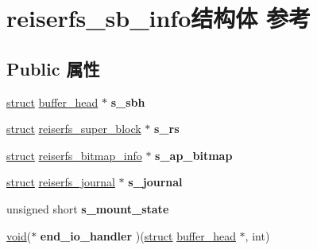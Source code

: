 \hypertarget{structreiserfs__sb__info}{}\section{reiserfs\+\_\+sb\+\_\+info结构体 参考}
\label{structreiserfs__sb__info}
\subsection*{Public 属性}
\begin{DoxyCompactItemize}
\item 
\mbox{\label{structreiserfs__sb__info_adb9d2be731b19dfcb1be8f90e3a9521b}} 
\hyperlink{interfacestruct}{struct} \hyperlink{structbuffer__head}{buffer\+\_\+head} $\ast$ {\bfseries s\+\_\+sbh}
\item 
\mbox{\label{structreiserfs__sb__info_a06ce31d699e52c3c13f527bc50f54f98}} 
\hyperlink{interfacestruct}{struct} \hyperlink{structreiserfs__super__block}{reiserfs\+\_\+super\+\_\+block} $\ast$ {\bfseries s\+\_\+rs}
\item 
\mbox{\label{structreiserfs__sb__info_abb3eb74c219233dbee19bdc773eecfb2}} 
\hyperlink{interfacestruct}{struct} \hyperlink{structreiserfs__bitmap__info}{reiserfs\+\_\+bitmap\+\_\+info} $\ast$ {\bfseries s\+\_\+ap\+\_\+bitmap}
\item 
\mbox{\label{structreiserfs__sb__info_a336c4d67914767441651aa41966a82ca}} 
\hyperlink{interfacestruct}{struct} \hyperlink{structreiserfs__journal}{reiserfs\+\_\+journal} $\ast$ {\bfseries s\+\_\+journal}
\item 
\mbox{\label{structreiserfs__sb__info_ace6e93f639e2f6479c54cc3a8b43f015}} 
unsigned short {\bfseries s\+\_\+mount\+\_\+state}
\item 
\mbox{\label{structreiserfs__sb__info_abf071ceefc3d8fd70b3e883060efb809}} 
\hyperlink{interfacevoid}{void}($\ast$ {\bfseries end\+\_\+io\+\_\+handler} )(\hyperlink{interfacestruct}{struct} \hyperlink{structbuffer__head}{buffer\+\_\+head} $\ast$, int)
\item 
\mbox{\label{structreiserfs__sb__info_a2d10bddd60b623475686d2cb0bb1808c}} 

\end{DoxyCompactItemize}
